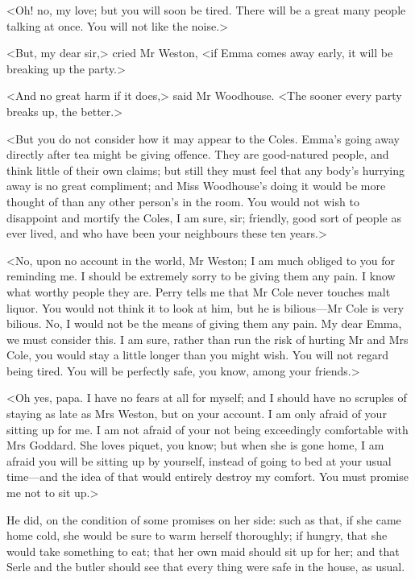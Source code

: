 <Oh! no, my love; but you will soon be tired. There will be a great many people talking at once. You will not like the noise.>

<But, my dear sir,> cried Mr Weston, <if Emma comes away early, it will be breaking up the party.>

<And no great harm if it does,> said Mr Woodhouse. <The sooner every party breaks up, the better.>

<But you do not consider how it may appear to the Coles. Emma's going away directly after tea might be giving offence. They are good-natured people, and think little of their own claims; but still they must feel that any body's hurrying away is no great compliment; and Miss Woodhouse's doing it would be more thought of than any other person's in the room. You would not wish to disappoint and mortify the Coles, I am sure, sir; friendly, good sort of people as ever lived, and who have been your neighbours these ten years.>

<No, upon no account in the world, Mr Weston; I am much obliged to you for reminding me. I should be extremely sorry to be giving them any pain. I know what worthy people they are. Perry tells me that Mr Cole never touches malt liquor. You would not think it to look at him, but he is bilious—Mr Cole is very bilious. No, I would not be the means of giving them any pain. My dear Emma, we must consider this. I am sure, rather than run the risk of hurting Mr and Mrs Cole, you would stay a little longer than you might wish. You will not regard being tired. You will be perfectly safe, you know, among your friends.>

<Oh yes, papa. I have no fears at all for myself; and I should have no scruples of staying as late as Mrs Weston, but on your account. I am only afraid of your sitting up for me. I am not afraid of your not being exceedingly comfortable with Mrs Goddard. She loves piquet, you know; but when she is gone home, I am afraid you will be sitting up by yourself, instead of going to bed at your usual time—and the idea of that would entirely destroy my comfort. You must promise me not to sit up.>

He did, on the condition of some promises on her side: such as that, if she came home cold, she would be sure to warm herself thoroughly; if hungry, that she would take something to eat; that her own maid should sit up for her; and that Serle and the butler should see that every thing were safe in the house, as usual.
